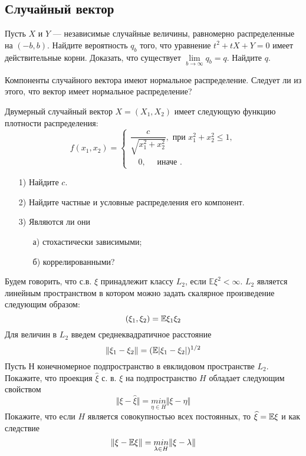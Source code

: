 \subsection{Случайный вектор}



\begin{problem}
Пусть $X$ и $Y$ --- независимые случайные величины, равномерно распределенные на $(-b,b)$. 
Найдите вероятность $q_b$ того, что уравнение $t^2+tX+Y=0$ имеет действительные корни. Доказать, что 
существует $\lim\limits_{b\to\infty} q_b=q$. Найдите $q$. 
\end{problem}


\begin{problem}
Компоненты случайного вектора имеют нормальное распределение. Следует ли из этого, что вектор имеет нормальное распределение? 
\end{problem}

\begin{problem}
Двумерный случайный вектор $X=(X_1,X_2)$  имеет следующую функцию плотности распределения: 
$$
f(x_1,x_2)=\begin{cases}
\dfrac{c}{\sqrt{x_1^2+x_2^2}}, \text{ при } x_1^2+x_2^2\leqslant 1 , \\
\quad 0, \quad\text{ иначе }. 
\end{cases}
$$
\begin{enumerate}
\item[1)] Найдите $c$. 
\item[2)] Найдите частные и условные распределения его компонент. 
\item[3)] Являются ли они 
\begin{enumerate}
\item[а)] стохастически зависимыми; 
\item[б)] коррелированными? 
\end{enumerate}
\end{enumerate}
\end{problem}

\begin{problem}
Будем говорить, что  с.в. $\xi$ принадлежит классу $L_2$, если ${\mathbb E}\xi^2<\infty$. $L_2$ является линейным пространством в котором можно задать скалярное произведение следующим образом:
\[
(\xi_1, \xi_2) = \mathrm{{\mathbb E}}{\xi_1 \xi_2}
\]
Для величин в $L_2$ введем среднеквадратичное расстояние
\[
\Vert \xi_1 - \xi_2 \Vert = (\mathrm{{\mathbb E}}{|\xi_1 - \xi_2|})^{1/2}
\]
Пусть $Н$ конечномерное  подпространство в евклидовом пространстве  $L_2$.
Покажите, что проекция $\widehat{\xi}$ с. в. $\xi$ на подпространство $H$ обладает следующим свойством  
\[
\Vert \xi - \widehat{\xi} \Vert = \underset{\eta \in H}{min} \Vert \xi - \eta \Vert
\]
Покажите, что если $H$ является совокупностью всех постоянных, то 
$\widehat{\xi}  = \mathrm{{\mathbb E}}{\xi}$ и как следствие 
\[
\Vert \xi - \mathrm{{\mathbb E}}{\xi} \Vert = \underset{\lambda \in H}{min} \Vert \xi - \lambda \Vert
\] 
\end{problem}

